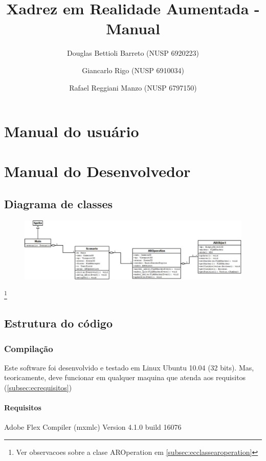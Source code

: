 \documentclass[a4paper,12pt]{book}
\title{Xadrez em Realidade Aumentada - Manual}
\author{
		Douglas Bettioli Barreto (NUSP 6920223)
		\and Giancarlo Rigo (NUSP 6910034)
		\and Rafael Reggiani Manzo (NUSP 6797150)
	   }
\begin{document}
\maketitle

\part{Manual do usu\'ario}
\label{part:manualdousuario}

\part{Manual do Desenvolvedor}
\label{part:manualdodesenvolvedor}
	\chapter{Diagrama de classes}
	\label{ch:diagramadeclasses}
	\begin{figure}[h]
	\centering
	\includegraphics[width=1.2\textwidth]{diagramadeclasses}
	\end{figure}
	\footnote{Ver observacoes sobre a clase AROperation em
			  \ref{subsec:ecclassearoperation}
			 }
			 
	\chapter{Estrutura do c\'odigo}
	\label{ch:estruturadocodigo}
	
	\section{Compila\c c\~ao}
	\label{sec:eccompilacao}
	Este software foi desenvolvido e testado em Linux Ubuntu 10.04 (32 bits). Mas,
	teoricamente, deve funcionar em qualquer maquina que atenda aos requisitos
	(\ref{subsec:ecrequisitos})
	
	\subsection{Requisitos}
	\label{subsec:ecrequisistos}
	\begin{itemmize}
		\item{Adobe Flex Compiler (mxmlc) Version 4.1.0 build 16076}
	\end{itemmize}
	
\end{document}
